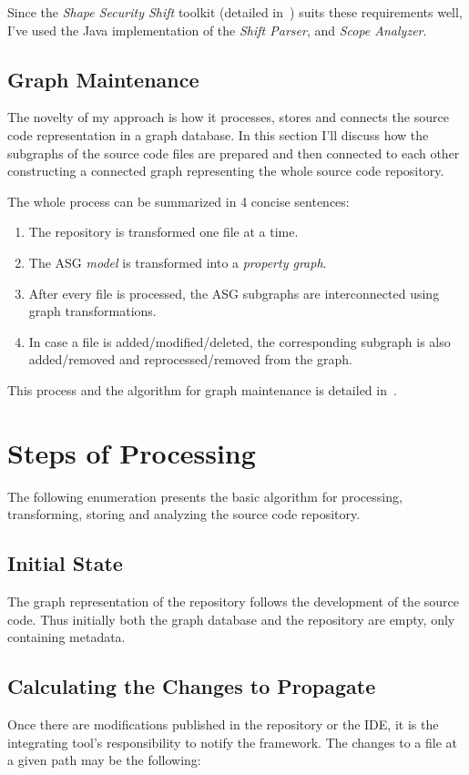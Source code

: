 Since the \emph{Shape Security Shift} toolkit (detailed in~) suits these requirements well, I've used the Java implementation of the \emph{Shift Parser}, and \emph{Scope Analyzer}.


\subsection{Graph Maintenance}
The novelty of my approach is how it processes, stores and connects the source code representation in a graph database. In this section I'll discuss how the subgraphs of the source code files are prepared and then connected to each other constructing a connected graph representing the whole source code repository.

The whole process can be summarized in 4 concise sentences:
\begin{enumerate}[topsep=0pt]
  \item The repository is transformed one file at a time.
  \item The ASG \emph{model} is transformed into a \emph{property graph}.
  \item After every file is processed, the ASG subgraphs are interconnected using graph transformations.
  \item In case a file is added/modified/deleted, the corresponding subgraph is also added/removed and reprocessed/removed from the graph.
\end{enumerate}

This process and the algorithm for graph maintenance is detailed in~.


\section{Steps of Processing}
The following enumeration presents the basic algorithm for processing, transforming, storing and analyzing the source code repository.

\subsection{Initial State}
The graph representation of the repository follows the development of the source code. Thus initially both the graph database and the repository are empty, only containing metadata.

\subsection{Calculating the Changes to Propagate}
Once there are modifications published in the repository or the IDE, it is the integrating tool's responsibility to notify the framework. The changes to a file at a given path may be the following:

